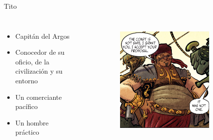 \begin{frame}{Tito}
	\begin{columns}
		\begin{itemize}
			\item Capitán del Argos
			\item Conocedor de su oficio, de la civilización y su entorno
			\item Un comerciante pacífico
			\item Un hombre práctico
		\end{itemize}
		\begin{figure}[htp]
			\centering
			\begin{subfigure}[b]{0.3\textwidth}
				\includegraphics[width=\textwidth]{img/tito/Ablaze}
			\end{subfigure}
			~
			\begin{subfigure}[b]{0.27\textwidth}

\end{subfigure}
\end{figure}
\end{columns}
\end{frame}
